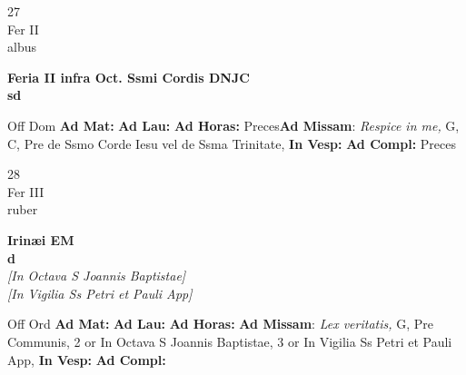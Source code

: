 \documentclass[10pt, openany]{book}
\begin{document}
        \begin{center}
            \begin{minipage}{3.5in}
                \vspace{2em}
                \begin{minipage}{0.5in}
                    {\Huge 27} \\
                    {\normalsize Fer II} \\
                    {\normalsize albus}
                \end{minipage}
                \begin{minipage}{3.0in}
                    \textbf{ \large Feria II infra Oct. Ssmi Cordis DNJC \\
                    \textnormal{\normalsize sd}} \\ 
                \end{minipage}
                \begin{justify}Off Dom
                    \textbf{Ad Mat: }
                    \textbf{Ad Lau: }
                    \textbf{Ad Horas: }Preces\textbf{Ad Missam}: \textit{Respice in me,} G, C, Pre de Ssmo Corde Iesu vel de Ssma Trinitate,  
                    \textbf{In Vesp: }
                    \textbf{Ad Compl: }Preces
                \end{justify}
            \end{minipage}
        \end{center}
    
        \begin{center}
            \begin{minipage}{3.5in}
                \vspace{2em}
                \begin{minipage}{0.5in}
                    {\Huge 28} \\
                    {\normalsize Fer III} \\
                    {\normalsize ruber}
                \end{minipage}
                \begin{minipage}{3.0in}
                    \textbf{ \large Irinæi EM \\
                    \textnormal{\normalsize d}} \\ \textit{[In Octava S Joannis Baptistae]} \\ \textit{[In Vigilia Ss Petri et Pauli App]} \\ 
                \end{minipage}
                \begin{justify}Off Ord
                    \textbf{Ad Mat: }
                    \textbf{Ad Lau: }
                    \textbf{Ad Horas: }\textbf{Ad Missam}: \textit{Lex veritatis,} G, Pre Communis, 2 or In Octava S Joannis Baptistae, 3 or In Vigilia Ss Petri et Pauli App,  
                    \textbf{In Vesp: }
                    \textbf{Ad Compl: }
                \end{justify}
            \end{minipage}
        \end{center}
    
\end{document}
